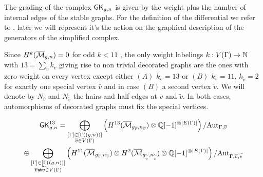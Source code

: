 The grading of the complex $\mathsf{GK}_{g,n}$ is given by the weight plus the number of internal edges of the stable graphs. For the definition of the differential we refer to \cite{CLPW2}, later we will represent it's the action on the graphical description of the generators of the simplified complex.

Since $H^{k}(\overline{\mathcal{M}}_{g,n})=0$ for odd $k<11$ \cite{BergstromFaberPayne}, the only weight labelings $k:V(\Gamma)\rightarrow\mathbb{N}$ with $13=\sum_v k_v$ giving rise to non trivial decorated graphs are the ones with zero weight on every vertex except either $(A)$ $k_{\bar{v}}=13$ or $(B)$ $k_{\bar{v}}=11$, $k_{\tilde{v}}=2$ for exactly one special vertex $\bar{v}$ and in case $(B)$ a second vertex $\tilde{v}$. We will denote by $N_{\bar{v}}$ and $N_{\tilde{v}}$ the hairs and half-edges at $\bar{v}$ and $\tilde{v}$. In both cases, automorphisms of decorated graphs must fix the special vertices.

\begin{multline}\label{equ:GK13}
    \mathsf{GK}^{13}_{g,n}
    = \bigoplus_{\substack{ [\Gamma]\in[\Gamma((g,n))] \\ \overline{v}\in V(\Gamma)}}
    \left( H^{13}(\overline{\mathcal{M}}_{g_{\overline{v}},n_{\overline{v}}}) \otimes \mathbb{Q}[-1]^{\otimes |E(\Gamma)|} \right)/\text{Aut}_{\Gamma,\overline{v}} \\
    \oplus \bigoplus_{\substack{ [\Gamma]\in[\Gamma((g,n))] \\ \overline{v}\neq\widetilde{v}\in V(\Gamma)}}
    \left( H^{11}(\overline{\mathcal{M}}_{g_{\overline{v}},n_{\overline{v}}}) \otimes H^{2}(\overline{\mathcal{M}}_{g_{\widetilde{v}},n_{\widetilde{v}}}) \otimes \mathbb{Q}[-1]^{\otimes |E(\Gamma)|} \right)/\text{Aut}_{\Gamma,\overline{v},\widetilde{v}}
\end{multline}


